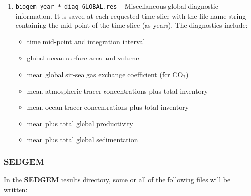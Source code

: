\documentclass[11pt,fleqn]{book} %
\begin{document}
\begin{enumerate}
\vspace{1mm}\item \texttt{biogem\_year\_*\_diag\_GLOBAL.res} -- Miscellaneous global diagnostic information. It is saved at each requested time-slice with the file-name string containing the mid-point of the time-slice (as years). The diagnostics include:
        \begin{itemize}
                \item time mid-point and integration interval
                \item global ocean surface area and volume
                \item mean global sir-sea gas exchange coefficient (for CO\begin{math}_2\end{math})
                \item mean atmospheric tracer concentrations plus total inventory
                \item mean ocean tracer concentrations plus total inventory
                \item mean plus total global productivity
                \item mean plus total global sedimentation
        \end{itemize}
        
\end{enumerate}\vspace{2mm}

\subsubsection{SEDGEM}

\noindent In the \textbf{SEDGEM} results directory, some or all of the following files will be written:
\end{document}
